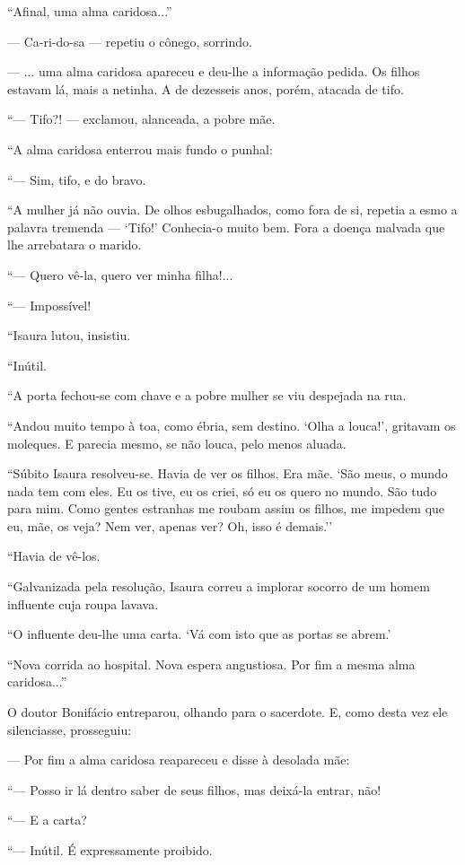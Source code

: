 ``Afinal, uma alma caridosa...''

--- Ca-ri-do-sa --- repetiu o cônego, sorrindo.

--- ... uma alma caridosa apareceu e deu-lhe a informação pedida. Os
filhos estavam lá, mais a netinha. A de dezesseis anos, porém, atacada
de tifo.

``--- Tifo?! --- exclamou, alanceada, a pobre mãe.

``A alma caridosa enterrou mais fundo o punhal:

``--- Sim, tifo, e do bravo.

``A mulher já não ouvia. De olhos esbugalhados, como fora de si, repetia
a esmo a palavra tremenda --- `Tifo!' Conhecia-o muito bem. Fora a
doença malvada que lhe arrebatara o marido.

``--- Quero vê-la, quero ver minha filha!...

``--- Impossível!

``Isaura lutou, insistiu.

``Inútil.

``A porta fechou-se com chave e a pobre mulher se viu despejada na rua.

``Andou muito tempo à toa, como ébria, sem destino. `Olha a louca!',
gritavam os moleques. E parecia mesmo, se não louca, pelo menos aluada.

``Súbito Isaura resolveu-se. Havia de ver os filhos. Era mãe. `São meus,
o mundo nada tem com eles. Eu os tive, eu os criei, só eu os quero no
mundo. São tudo para mim. Como gentes estranhas me roubam assim os
filhos, me impedem que eu, mãe, os veja? Nem ver, apenas ver? Oh, isso é
demais.''

``Havia de vê-los.

``Galvanizada pela resolução, Isaura correu a implorar socorro de um
homem influente cuja roupa lavava.

``O influente deu-lhe uma carta. `Vá com isto que as portas se abrem.'

``Nova corrida ao hospital. Nova espera angustiosa. Por fim a mesma alma
caridosa...''

O doutor Bonifácio entreparou, olhando para o sacerdote. E, como desta
vez ele silenciasse, prosseguiu:

--- Por fim a alma caridosa reapareceu e disse à desolada mãe:

``--- Posso ir lá dentro saber de seus filhos, mas deixá-la entrar, não!

``--- E a carta?

``--- Inútil. É expressamente proibido.

